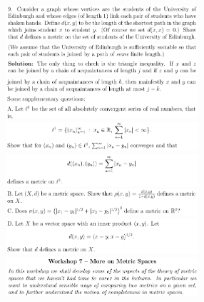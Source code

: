 \documentclass[8pt,landscape]{article}
\begin{document}
\begin{multicols}{3}
    \includegraphics[width=270]{078.png} \\
    \includegraphics[width=270]{079.png} \\
    \includegraphics[width=270]{080.png} \\
    \includegraphics[width=270]{081.png} \\
    \includegraphics[width=270]{082.png} \\
    \includegraphics[width=270]{083.png} \\
    \includegraphics[width=270]{084.png} \\
    \includegraphics[width=270]{085.png} \\

\end{multicols}
\end{document}
